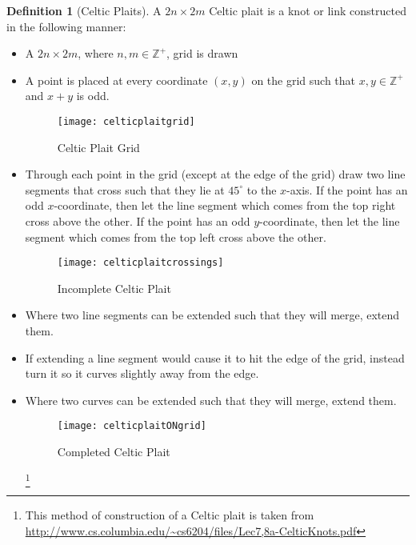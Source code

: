 \documentclass[10pt,a4paper]{report}
\theoremstyle{definition}
\newtheorem{definition}{Definition}[section]
\theoremstyle{remark}
\theoremstyle{example}
\begin{document}
\begin{definition}[Celtic Plaits]

A $2n\times 2m$ Celtic plait is a knot or link constructed in the following manner:
\begin{itemize}
\item A $2n\times 2m$, where $n,m \in  \mathbb{Z}^{+}$, grid is drawn
\item A point is placed at every coordinate $(x,y)$ on the grid such that $x,y \in  \mathbb{Z}^{+}$ and $x+y$ is odd.
\begin{figure}[H]
\centering
\graphicspath{{/Users/Imogen/Desktop/seifertimages/lapath/}}
\texttt{[image: celticplaitgrid]}
\caption{Celtic Plait Grid}
\label{celticplaitgrid}
\end{figure}

\item Through each point in the grid (except at the edge of the grid) draw two line segments that cross such that they lie at $45^{\circ}$ to the $x$-axis. If the point has an odd $x$-coordinate, then let the line segment which comes from the top right cross above the other. If the point has an odd $y$-coordinate, then let the line segment which comes from the top left cross above the other. 

\begin{figure}[H]
\centering
\graphicspath{{/Users/Imogen/Desktop/seifertimages/lapath/}}
\texttt{[image: celticplaitcrossings]}
\caption{Incomplete Celtic Plait}
\label{celticplaitcrossings}
\end{figure}

\item Where two line segments can be extended such that they will merge, extend them. 
\item If extending a line segment would cause it to hit the edge of the grid, instead turn it so it curves slightly away from the edge.
\item Where two curves can be extended such that they will merge, extend them. 

\begin{figure}[H]
\centering
\graphicspath{{/Users/Imogen/Desktop/seifertimages/lapath/}}
\texttt{[image: celticplaitONgrid]}
\caption{Completed Celtic Plait}
\label{celticplaitONgrid}
\end{figure}

\footnote{This method of construction of a Celtic plait is taken from \url{http://www.cs.columbia.edu/~cs6204/files/Lec7,8a-CelticKnots.pdf}}
\end{itemize}
\end{definition}
\end{document}
